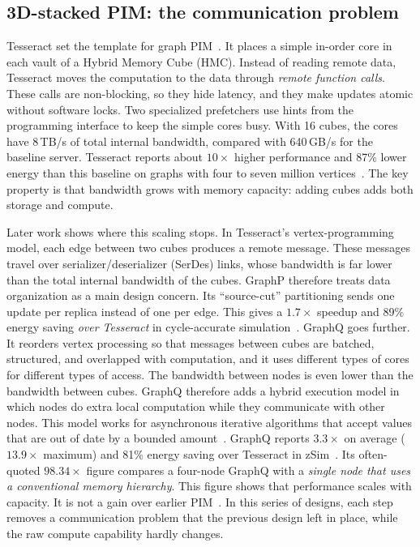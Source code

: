 \documentclass[journal,onecolumn]{IEEEtran}
\begin{document}
\subsection{3D-stacked PIM: the communication problem}
Tesseract set the template for graph PIM~\cite{ahn2015tesseract}. It places a simple in-order core in each vault of a Hybrid Memory Cube (HMC). Instead of reading remote data, Tesseract moves the computation to the data through \emph{remote function calls}. These calls are non-blocking, so they hide latency, and they make updates atomic without software locks. Two specialized prefetchers use hints from the programming interface to keep the simple cores busy. With 16 cubes, the cores have 8\,TB/s of total internal bandwidth, compared with 640\,GB/s for the baseline server. Tesseract reports about $10\times$ higher performance and 87\% lower energy than this baseline on graphs with four to seven million vertices~\cite{ahn2015tesseract}. The key property is that bandwidth grows with memory capacity: adding cubes adds both storage and compute.

Later work shows where this scaling stops. In Tesseract's vertex-programming model, each edge between two cubes produces a remote message. These messages travel over serializer/deserializer (SerDes) links, whose bandwidth is far lower than the total internal bandwidth of the cubes. GraphP therefore treats data organization as a main design concern. Its ``source-cut'' partitioning sends one update per replica instead of one per edge. This gives a $1.7\times$ speedup and 89\% energy saving \emph{over Tesseract} in cycle-accurate simulation~\cite{zhang2018graphp}. GraphQ goes further. It reorders vertex processing so that messages between cubes are batched, structured, and overlapped with computation, and it uses different types of cores for different types of access. The bandwidth between nodes is even lower than the bandwidth between cubes. GraphQ therefore adds a hybrid execution model in which nodes do extra local computation while they communicate with other nodes. This model works for asynchronous iterative algorithms that accept values that are out of date by a bounded amount~\cite{zhuo2019graphq}. GraphQ reports $3.3\times$ on average ($13.9\times$ maximum) and 81\% energy saving over Tesseract in zSim~\cite{zhuo2019graphq}. Its often-quoted $98.34\times$ figure compares a four-node GraphQ with a \emph{single node that uses a conventional memory hierarchy}. This figure shows that performance scales with capacity. It is not a gain over earlier PIM~\cite{zhuo2019graphq}. In this series of designs, each step removes a communication problem that the previous design left in place, while the raw compute capability hardly changes.
\end{document}
